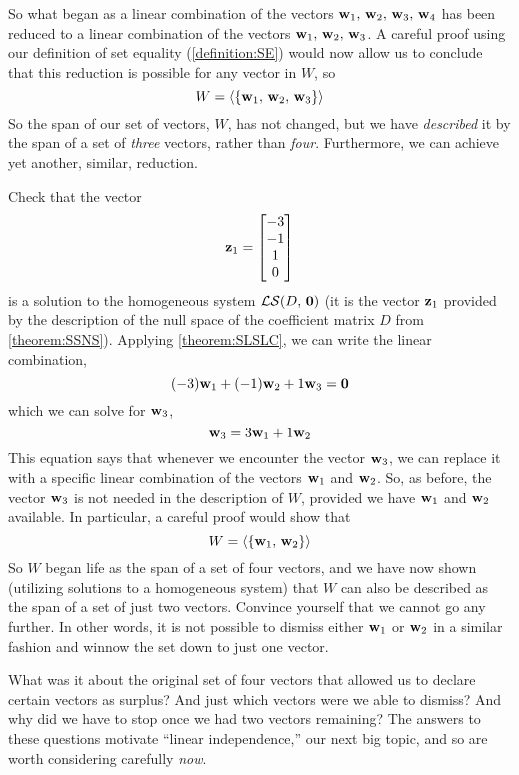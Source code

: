 \documentclass{ximera}
\begin{document}
\begin{example}
  So what began as a linear combination of the vectors
  $\mathbf{w}_1,\,\mathbf{w}_2,\,\mathbf{w}_3,\,\mathbf{w}_4$ has been reduced
  to a linear combination of the vectors
  $\mathbf{w}_1,\,\mathbf{w}_2,\,\mathbf{w}_3$.  A careful proof using our
  definition of set equality (\ref{definition:SE}) would now allow us
  to conclude that this reduction is possible for any vector in $W$,
  so
  \[
    W=\left\langle\left\{\mathbf{w}_1,\,\mathbf{w}_2,\,\mathbf{w}_3\right\}\right\rangle
  \]
  So the span of our set of vectors, $W$, has not changed, but we have
  \textit{described} it by the span of a set of \textit{three}
  vectors, rather than \textit{four}.  Furthermore, we can achieve yet
  another, similar, reduction.

  Check that the vector
  \[
    \mathbf{z}_1=\begin{bmatrix}-3\\-1\\1\\0\end{bmatrix}
  \]
  is a solution to the homogeneous system
  $\mathcal{LS}\!\left(D,\,\mathbf{0}\right)$ (it is the vector $\mathbf{z}_1$
  provided by the description of the null space of the coefficient
  matrix $D$ from \ref{theorem:SSNS}).  Applying \ref{theorem:SLSLC},
  we can write the linear combination,
  \[
    (-3)\mathbf{w}_1+(-1)\mathbf{w}_2+1\mathbf{w}_3=\mathbf{0}
  \]
  which we can solve for $\mathbf{w}_3$,
  \[
    \mathbf{w}_3=3\mathbf{w}_1+1\mathbf{w}_2
  \]
  This equation says that whenever we encounter the vector
  $\mathbf{w}_3$, we can replace it with a specific linear combination
  of the vectors $\mathbf{w}_1$ and $\mathbf{w}_2$.  So, as before, the
  vector $\mathbf{w}_3$ is not needed in the description of $W$,
  provided we have $\mathbf{w}_1$ and $\mathbf{w}_2$ available.  In
  particular, a careful proof would show that
  \[
    W=\left\langle\left\{\mathbf{w}_1,\,\mathbf{w}_2\right\}\right\rangle
  \]
  So $W$ began life as the span of a set of four vectors, and we have
  now shown (utilizing solutions to a homogeneous system) that $W$ can
  also be described as the span of a set of just two vectors.
  Convince yourself that we cannot go any further.  In other words, it
  is not possible to dismiss either $\mathbf{w}_1$ or $\mathbf{w}_2$ in a
  similar fashion and winnow the set down to just one vector.

  What was it about the original set of four vectors that allowed us
  to declare certain vectors as surplus?  And just which vectors were
  we able to dismiss?  And why did we have to stop once we had two
  vectors remaining?  The answers to these questions motivate ``linear
  independence,'' our next big topic, and so are worth considering
  carefully \textit{now}.
\end{example}
\end{document}
